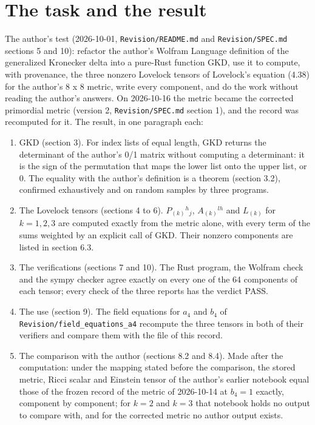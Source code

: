 \documentclass[11pt]{article}
\begin{document}
\section{The task and the result}

The author's test (2026-10-01, \texttt{Revision\allowbreak{}/README.\allowbreak{}md} and \texttt{Revision\allowbreak{}/SPEC.md} sections 5 and 10): refactor the author's Wolfram Language definition of the generalized Kronecker delta into a pure-Rust function GKD, use it to compute, with provenance, the three nonzero Lovelock tensors of Lovelock's equation (4.38) for the author's 8 x 8 metric, write every component, and do the work without reading the author's answers. On 2026-10-16 the metric became the corrected primordial metric (version 2, \texttt{Revision\allowbreak{}/SPEC.md} section 1), and the record was recomputed for it. The result, in one paragraph each:

\begin{enumerate}
\item GKD (section 3). For index lists of equal length, GKD returns the determinant of the author's 0/1 matrix without computing a determinant: it is the sign of the permutation that maps the lower list onto the upper list, or 0. The equality with the author's definition is a theorem (section 3.2), confirmed exhaustively and on random samples by three programs.
\item The Lovelock tensors (sections 4 to 6). $P_{(k)}{}^h{}_j$, $A_{(k)}{}^{lh}$ and $L_{(k)}$ for $k = 1, 2, 3$ are computed exactly from the metric alone, with every term of the sums weighted by an explicit call of GKD. Their nonzero components are listed in section 6.3.
\item The verifications (sections 7 and 10). The Rust program, the Wolfram check and the sympy checker agree exactly on every one of the 64 components of each tensor; every check of the three reports has the verdict PASS.
\item The use (section 9). The field equations for $a_4$ and $b_4$ of \texttt{Revision\allowbreak{}/field\_e\allowbreak{}quations\allowbreak{}\_a4} recompute the three tensors in both of their verifiers and compare them with the file of this record.
\item The comparison with the author (sections 8.2 and 8.4). Made after the computation: under the mapping stated before the comparison, the stored metric, Ricci scalar and Einstein tensor of the author's earlier notebook equal those of the frozen record of the metric of 2026-10-14 at $b_4 = 1$ exactly, component by component; for $k = 2$ and $k = 3$ that notebook holds no output to compare with, and for the corrected metric no author output exists.
\end{enumerate}
\end{document}
